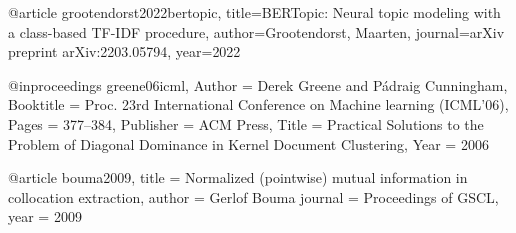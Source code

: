 @article{
	grootendorst2022bertopic,
	title={BERTopic: Neural topic modeling with a class-based TF-IDF procedure},
	author={Grootendorst, Maarten},
	journal={arXiv preprint arXiv:2203.05794},
	year={2022}
}

@inproceedings{
	greene06icml,
	Author = {Derek Greene and P\'{a}draig Cunningham},
	Booktitle = {Proc. 23rd International Conference on Machine learning (ICML'06)},
	Pages = {377--384},
	Publisher = {ACM Press},
	Title = {Practical Solutions to the Problem of Diagonal Dominance in Kernel Document Clustering},
	Year = {2006}
}

@article{
	bouma2009,
	title = {Normalized (pointwise) mutual information in collocation extraction},
	author = {Gerlof Bouma}
	journal = {Proceedings of GSCL},
	year = {2009}
}